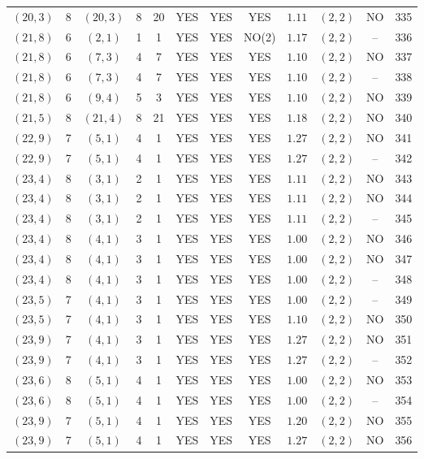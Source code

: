 \begin{longtable}{|c|c|c|c|c|c|c|c|c|c|c|c|}
$(20,3)$ & 8 & $(20,3)$ & 8 & 20 & YES & YES & YES & $1.11$ & $(2,2)$ & NO & 335\\
$(21,8)$ & 6 & $(2,1)$ & 1 & 1 & YES & YES & NO(2) & $1.17$ & $(2,2)$ & -- & 336\\
$(21,8)$ & 6 & $(7,3)$ & 4 & 7 & YES & YES & YES & $1.10$ & $(2,2)$ & NO & 337\\
$(21,8)$ & 6 & $(7,3)$ & 4 & 7 & YES & YES & YES & $1.10$ & $(2,2)$ & -- & 338\\
$(21,8)$ & 6 & $(9,4)$ & 5 & 3 & YES & YES & YES & $1.10$ & $(2,2)$ & NO & 339\\
$(21,5)$ & 8 & $(21,4)$ & 8 & 21 & YES & YES & YES & $1.18$ & $(2,2)$ & NO & 340\\
$(22,9)$ & 7 & $(5,1)$ & 4 & 1 & YES & YES & YES & $1.27$ & $(2,2)$ & NO & 341\\
$(22,9)$ & 7 & $(5,1)$ & 4 & 1 & YES & YES & YES & $1.27$ & $(2,2)$ & -- & 342\\
$(23,4)$ & 8 & $(3,1)$ & 2 & 1 & YES & YES & YES & $1.11$ & $(2,2)$ & NO & 343\\
$(23,4)$ & 8 & $(3,1)$ & 2 & 1 & YES & YES & YES & $1.11$ & $(2,2)$ & NO & 344\\
$(23,4)$ & 8 & $(3,1)$ & 2 & 1 & YES & YES & YES & $1.11$ & $(2,2)$ & -- & 345\\
$(23,4)$ & 8 & $(4,1)$ & 3 & 1 & YES & YES & YES & $1.00$ & $(2,2)$ & NO & 346\\
$(23,4)$ & 8 & $(4,1)$ & 3 & 1 & YES & YES & YES & $1.00$ & $(2,2)$ & NO & 347\\
$(23,4)$ & 8 & $(4,1)$ & 3 & 1 & YES & YES & YES & $1.00$ & $(2,2)$ & -- & 348\\
$(23,5)$ & 7 & $(4,1)$ & 3 & 1 & YES & YES & YES & $1.00$ & $(2,2)$ & -- & 349\\
$(23,5)$ & 7 & $(4,1)$ & 3 & 1 & YES & YES & YES & $1.10$ & $(2,2)$ & NO & 350\\
$(23,9)$ & 7 & $(4,1)$ & 3 & 1 & YES & YES & YES & $1.27$ & $(2,2)$ & NO & 351\\
$(23,9)$ & 7 & $(4,1)$ & 3 & 1 & YES & YES & YES & $1.27$ & $(2,2)$ & -- & 352\\
$(23,6)$ & 8 & $(5,1)$ & 4 & 1 & YES & YES & YES & $1.00$ & $(2,2)$ & NO & 353\\
$(23,6)$ & 8 & $(5,1)$ & 4 & 1 & YES & YES & YES & $1.00$ & $(2,2)$ & -- & 354\\
$(23,9)$ & 7 & $(5,1)$ & 4 & 1 & YES & YES & YES & $1.20$ & $(2,2)$ & NO & 355\\
$(23,9)$ & 7 & $(5,1)$ & 4 & 1 & YES & YES & YES & $1.27$ & $(2,2)$ & NO & 356\\

\end{longtable}
